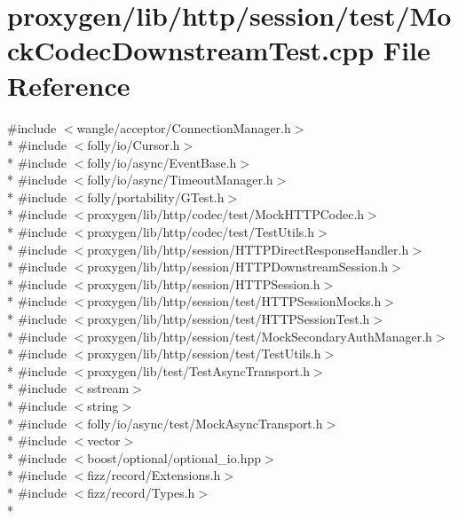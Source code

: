 \section{proxygen/lib/http/session/test/\+Mock\+Codec\+Downstream\+Test.cpp File Reference}
\label{MockCodecDownstreamTest_8cpp}
{\ttfamily \#include $<$wangle/acceptor/\+Connection\+Manager.\+h$>$}\\*
{\ttfamily \#include $<$folly/io/\+Cursor.\+h$>$}\\*
{\ttfamily \#include $<$folly/io/async/\+Event\+Base.\+h$>$}\\*
{\ttfamily \#include $<$folly/io/async/\+Timeout\+Manager.\+h$>$}\\*
{\ttfamily \#include $<$folly/portability/\+G\+Test.\+h$>$}\\*
{\ttfamily \#include $<$proxygen/lib/http/codec/test/\+Mock\+H\+T\+T\+P\+Codec.\+h$>$}\\*
{\ttfamily \#include $<$proxygen/lib/http/codec/test/\+Test\+Utils.\+h$>$}\\*
{\ttfamily \#include $<$proxygen/lib/http/session/\+H\+T\+T\+P\+Direct\+Response\+Handler.\+h$>$}\\*
{\ttfamily \#include $<$proxygen/lib/http/session/\+H\+T\+T\+P\+Downstream\+Session.\+h$>$}\\*
{\ttfamily \#include $<$proxygen/lib/http/session/\+H\+T\+T\+P\+Session.\+h$>$}\\*
{\ttfamily \#include $<$proxygen/lib/http/session/test/\+H\+T\+T\+P\+Session\+Mocks.\+h$>$}\\*
{\ttfamily \#include $<$proxygen/lib/http/session/test/\+H\+T\+T\+P\+Session\+Test.\+h$>$}\\*
{\ttfamily \#include $<$proxygen/lib/http/session/test/\+Mock\+Secondary\+Auth\+Manager.\+h$>$}\\*
{\ttfamily \#include $<$proxygen/lib/http/session/test/\+Test\+Utils.\+h$>$}\\*
{\ttfamily \#include $<$proxygen/lib/test/\+Test\+Async\+Transport.\+h$>$}\\*
{\ttfamily \#include $<$sstream$>$}\\*
{\ttfamily \#include $<$string$>$}\\*
{\ttfamily \#include $<$folly/io/async/test/\+Mock\+Async\+Transport.\+h$>$}\\*
{\ttfamily \#include $<$vector$>$}\\*
{\ttfamily \#include $<$boost/optional/optional\+\_\+io.\+hpp$>$}\\*
{\ttfamily \#include $<$fizz/record/\+Extensions.\+h$>$}\\*
{\ttfamily \#include $<$fizz/record/\+Types.\+h$>$}\\*
